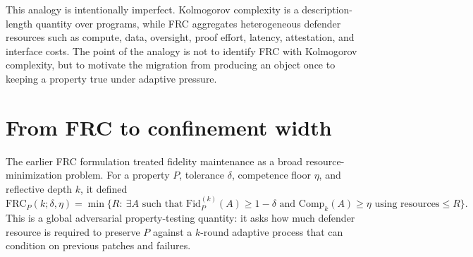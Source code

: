 \documentclass[11pt]{article}
\theoremstyle{definition}
\theoremstyle{remark}
\begin{document}
This analogy is intentionally imperfect. Kolmogorov complexity is a description-length quantity over programs, while FRC aggregates heterogeneous defender resources such as compute, data, oversight, proof effort, latency, attestation, and interface costs. The point of the analogy is not to identify FRC with Kolmogorov complexity, but to motivate the migration from producing an object once to keeping a property true under adaptive pressure.

\section{From FRC to confinement width}\label{app:migration}

The earlier FRC formulation \cite{dugan2025frc} treated fidelity maintenance as a broad resource-minimization problem. For a property $P$, tolerance $\delta$, competence floor $\eta$, and reflective depth $k$, it defined
\begin{equation}
\mathrm{FRC}_P(k;\delta,\eta)=\min\{R:\ \exists A\text{ such that }\mathrm{Fid}^{(k)}_P(A)\ge1-\delta\text{ and }\mathrm{Comp}_k(A)\ge\eta\text{ using resources}\le R\}.
\end{equation}
This is a global adversarial property-testing quantity: it asks how much defender resource is required to preserve $P$ against a $k$-round adaptive process that can condition on previous patches and failures.
\end{document}
